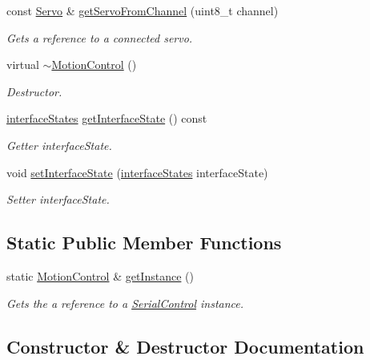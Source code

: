 \begin{DoxyCompactItemize}
$$const \hyperlink{class_servo}{Servo} \& \hyperlink{class_motion_control_a72090241f759360a28b506920152a47e}{get\+Servo\+From\+Channel} (uint8\+\_\+t channel)
\begin{DoxyCompactList}\small\item\em Gets a reference to a connected servo. \end{DoxyCompactList}\item 
virtual \hyperlink{class_motion_control_a43171f06f0911cc220031109cc1636d0}{$\sim$\+Motion\+Control} ()
\begin{DoxyCompactList}\small\item\em Destructor. \end{DoxyCompactList}\item 
\hyperlink{_motion_control_8hpp_ac095d62e5392b8d263c10f37a76e6d9b}{interface\+States} \hyperlink{class_motion_control_ace751f7251f62b4f3c9180b172eedc5f}{get\+Interface\+State} () const 
\begin{DoxyCompactList}\small\item\em Getter interface\+State. \end{DoxyCompactList}\item 
void \hyperlink{class_motion_control_a6c5973e8371249dc5d055831470808ac}{set\+Interface\+State} (\hyperlink{_motion_control_8hpp_ac095d62e5392b8d263c10f37a76e6d9b}{interface\+States} interface\+State)
\begin{DoxyCompactList}\small\item\em Setter interface\+State. \end{DoxyCompactList}\end{DoxyCompactItemize}
\subsection*{Static Public Member Functions}
\begin{DoxyCompactItemize}
\item 
static \hyperlink{class_motion_control}{Motion\+Control} \& \hyperlink{class_motion_control_a9918895a97629d892598701a0df519e2}{get\+Instance} ()
\begin{DoxyCompactList}\small\item\em Gets the a reference to a \hyperlink{class_serial_control}{Serial\+Control} instance. \end{DoxyCompactList}\end{DoxyCompactItemize}


\subsection{Constructor \& Destructor Documentation}
